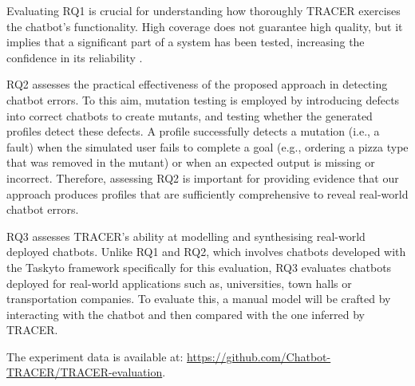 Evaluating RQ1 is crucial for understanding
how thoroughly \ac{TRACER} exercises the chatbot’s functionality.
High coverage does not guarantee high quality,
but it implies that a significant part of a system has been tested,
increasing the confidence in its reliability
\autocite{ammannIntroductionSoftwareTesting2017}.


RQ2 assesses the practical effectiveness
of the proposed approach in detecting chatbot errors.
To this aim, mutation testing is employed
\autocite{demilloHintsTestData1978}
by introducing defects into correct chatbots to create mutants,
and testing whether the generated profiles detect these defects.
A profile successfully detects a mutation (i.e., a fault)
when the simulated user fails to complete a goal
(e.g., ordering a pizza type that was removed in the mutant)
or when an expected output is missing or incorrect.
Therefore, assessing RQ2 is important
for providing evidence that our approach produces
profiles that are sufficiently comprehensive
to reveal real-world chatbot errors.

RQ3 assesses \ac{TRACER}'s ability at modelling and synthesising
real-world deployed chatbots.
Unlike RQ1 and RQ2, which involves chatbots developed with the Taskyto framework
specifically for this evaluation,
RQ3 evaluates chatbots deployed for real-world applications
such as, universities, town halls or transportation companies.
To evaluate this, a manual model will be crafted
by interacting with the chatbot
and then compared with the one inferred by \ac{TRACER}.

The experiment data is available at:
\url{https://github.com/Chatbot-TRACER/TRACER-evaluation}.


